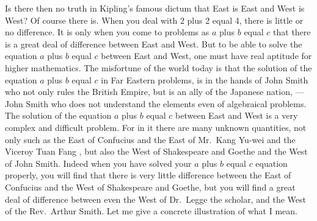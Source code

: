 Is there then no truth in Kipling's  famous dictum that East is East and West is West?
Of course there is.
When you deal with 2 plus 2 equal 4, there is little or no difference.
It is only when you come to problems as $a$ plus $b$ equal $c$ that there is a great deal of difference between East and West.
But to be able to solve the equation $a$ plus $b$ equal $c$ between East and West, one must have real aptitude for higher mathematics.
The misfortune of the world today is that the solution of the equation $a$ plus $b$ equal $c$ in Far Eastern problems, is in the hands of John Smith who not only rules the British Empire, but is an ally of the Japanese nation, --- John Smith who does not understand the elements even of algebraical problems.
The solution of the equation $a$ plus $b$ equal $c$ between East and West is a very complex and difficult problem.
For in it there are many unknown quantities, not only such as the East of Confucius and the East of Mr.~Kang Yu-wei  and the Viceroy Tuan Fang , but also the West of Shakespeare and Goethe and the West of John Smith.
Indeed when you have solved your $a$ plus $b$ equal $c$ equation properly, you will find that there is very little difference between the East of Confucius and the West of Shakespeare and Goethe, but you will find a great deal of difference between even the West of Dr.~Legge  the scholar, and the West of the Rev.~Arthur Smith.
Let me give a concrete illustration of what I mean.

